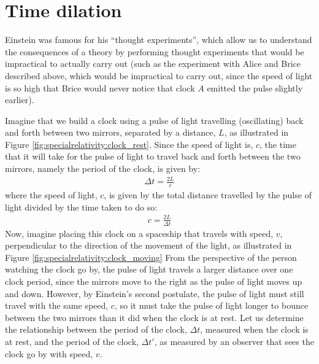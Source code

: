 \section{Time dilation}
Einstein was famous for his ``thought experiments'', which allow us to understand the consequences of a theory by performing thought experiments that would be impractical to actually carry out (such as the experiment with Alice and Brice described above, which would be impractical to carry out, since the speed of light is so high that Brice would never notice that clock $A$ emitted the pulse slightly earlier). 

Imagine that we build a clock using a pulse of light travelling (oscillating) back and forth between two mirrors, separated by a distance, $L$, as illustrated in Figure \ref{fig:specialrelativity:clock_rest}.
Since the speed of light is, $c$, the time that it will take for the pulse of light to travel back and forth between the two mirrors, namely the period of the clock, is given by:
\begin{align*}
\Delta t = \frac{2L}{c}
\end{align*}
where the speed of light, $c$, is given by the total distance travelled by the pulse of light divided by the time taken to do so:
\begin{align*}
c=\frac{2L}{\Delta t}
\end{align*}
Now, imagine placing this clock on a spaceship that travels with speed, $v$, perpendicular to the direction of the movement of the light, as illustrated in Figure \ref{fig:specialrelativity:clock_moving}
From the perspective of the person watching the clock go by, the pulse of light travels a larger distance over one clock period, since the mirrors move to the right as the pulse of light moves up and down. However, by Einstein's second postulate, the pulse of light must still travel with the same speed, $c$, so it must take the pulse of light longer to bounce between the two mirrors than it did when the clock is at rest. Let us determine the relationship between the period of the clock, $\Delta t$, measured when the clock is at rest, and the period of the clock, $\Delta t'$, as measured by an observer that sees the clock go by with speed, $v$. 


